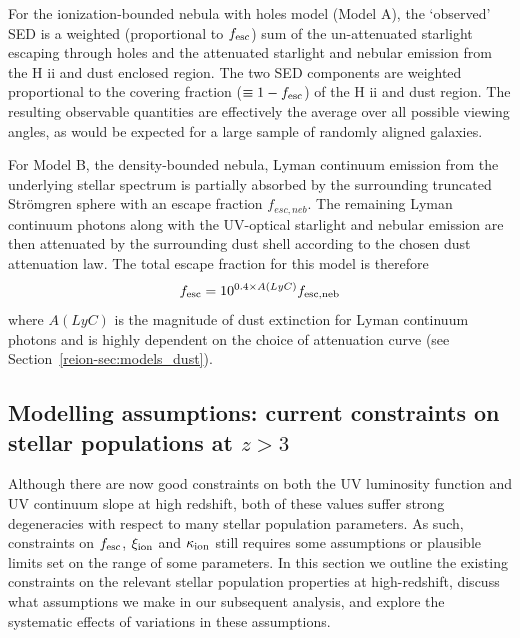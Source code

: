 For the ionization-bounded nebula with holes model (Model A), the `observed' SED is a weighted (proportional to $f_{\rm{esc}}$) sum of the un-attenuated starlight escaping through holes and the attenuated starlight and nebular emission from the H {\sc ii} and dust enclosed region. The two SED components are weighted proportional to the covering fraction ($\equiv 1 - f_{\rm{esc}}$) of the H {\sc ii} and dust region. The resulting observable quantities are effectively the average over all possible viewing angles, as would be expected for a large sample of randomly aligned galaxies.

For Model B, the density-bounded nebula, Lyman continuum emission from the underlying stellar spectrum is partially absorbed by the surrounding truncated Str\"{o}mgren sphere with an escape fraction $f_{esc,neb}$. The remaining Lyman continuum photons along with the UV-optical starlight and nebular emission are then attenuated by the surrounding dust shell according to the chosen dust attenuation law. The total escape fraction for this model is therefore
\begin{equation}
f_{\rm{esc}} = 10^{0.4\times A(LyC)}f_{\rm{esc,neb}}
\end{equation}
where $A(LyC)$ is the magnitude of dust extinction for Lyman continuum photons and is highly dependent on the choice of attenuation curve (see Section~\ref{reion-sec:models_dust}).

\subsection{Modelling assumptions: current constraints on stellar populations at $z>3$}\label{reion-sec:assumptions}
Although there are now good constraints on both the UV luminosity function and UV continuum slope at high redshift, both of these values suffer strong degeneracies with respect to many stellar population parameters. As such, constraints on $f_{\rm{esc}}$, $\xi_{\rm{ion}}$ and $\kappa_{\rm{ion}}$ still requires some assumptions or plausible limits set on the range of some parameters. In this section we outline the existing constraints on the relevant stellar population properties at high-redshift, discuss what assumptions we make in our subsequent analysis, and explore the systematic effects of variations in these assumptions.  

